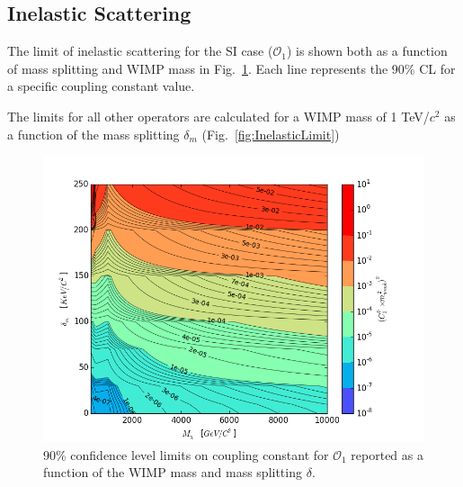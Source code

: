 \subsection{Inelastic Scattering}
The limit of inelastic scattering for the SI case ($\mathcal{O}_1$) is shown both as a function of mass splitting and WIMP mass in Fig.~\ref{fig:O1Inel}. Each line represents the 90\% CL for a specific coupling constant value. 

The limits for all other operators are calculated for a WIMP mass of 1 TeV/$c^2$ as a function of the mass splitting $\delta_m$ (Fig.~\ref{fig:InelasticLimit}) 
\begin{figure}[h!]
\centerline{\includegraphics[width=1.\linewidth]{Figures/inelastic_delta_vs_m.png}}
\caption{90\% confidence level limits on coupling constant for $\mathcal{O}_1$ reported as a function of the WIMP mass and mass splitting $\delta$.}
\label{fig:O1Inel}
\end{figure}  



